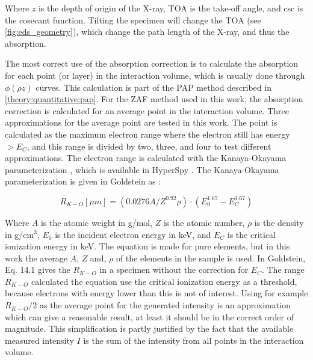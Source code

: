 Where $z$ is the depth of origin of the X-ray, TOA is the take-off angle, and csc is the cosecant function.
Tilting the specimen will change the TOA (see \cref{fig:eds_geometry}), which change the path length of the X-ray, and thus the absorption.



The most correct use of the absorption correction is to calculate the absorption for each point (or layer) in the interaction volume, which is usually done through $\phi(\rho z)$ curves.
This calculation is part of the PAP method described in \cref{theory:quantitative:pap}.
For the ZAF method used in this work, the absorption correction is calculated for an average point in the interaction volume.
Three approximations for the average point are tested in this work. 
The point is calculated as the maximum electron range where the electron still has energy $> E_C$, and this range is divided by two, three, and four to test different approximations.
The electron range is calculated with the Kanaya-Okayama parameterization \cite{kanaya1972}, which is available in HyperSpy \cite{hyperspy_1.7.1}.
The Kanaya-Okayama parameterization is given in Goldstein as \cite[22.5]{goldstein_scanning_2018}:

\begin{equation}
    \label{eq:theory:quantitative:kanaya_okayama}
    R_{K-O} [\mu m] = (0.0276 A / Z ^{0.92} \rho) \cdot (E_0^{1.67} - E_C^{1.67})
\end{equation}

Where $A$ is the atomic weight in g/mol, $Z$ is the atomic number, $\rho$ is the density in g/cm$^3$, $E_0$ is the incident electron energy in keV, and $E_C$ is the critical ionization energy in keV.
The equation is made for pure elements, but in this work the average $A$, $Z$ and, $\rho$ of the elements in the sample is used.
In Goldstein, Eq. 14.1 gives the $R_{K-O}$ in a specimen without the correction for $E_C$.
The range $R_{K-O}$ calculated the equation use the critical ionization energy as a threshold, because electrons with energy lower than this is not of interest.
Using for example $R_{K-O}/2$ as the average point for the generated intensity is an approximation which can give a reasonable result, at least it should be in the correct order of magnitude.
This simplification is partly justified by the fact that the available measured intensity $I$ is the sum of the intensity from all points in the interaction volume.


